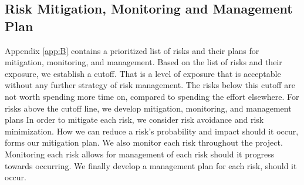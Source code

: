 \subsection{Risk Mitigation, Monitoring and Management Plan}
Appendix \ref{app:B} contains a prioritized list of risks and their plans for mitigation, monitoring, and management. Based on the list of risks and their exposure, we establish a cutoff. That is a level of exposure that is acceptable without any further strategy of risk management. The risks below this cutoff are not worth spending more time on, compared to spending the effort elsewhere. For risks above the cutoff line, we develop mitigation, monitoring, and management plans\newline 
In order to mitigate each risk, we consider risk avoidance and risk minimization. How we can reduce a risk's probability and impact should it occur, forms our mitigation plan. We also monitor each risk throughout the project. Monitoring each risk allows for management of each risk should it progress towards occurring. We finally develop a management plan for each risk, should it occur.